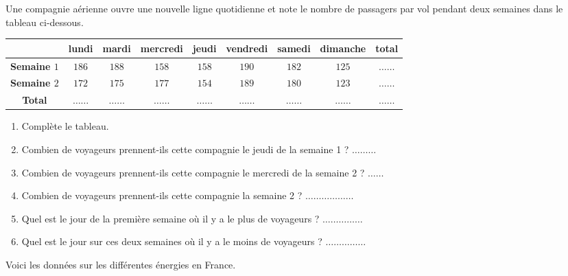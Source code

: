 \begin{pageAuto} 

 
\ExoAuto
 
Une compagnie aérienne ouvre une nouvelle ligne quotidienne et note le nombre de passagers par vol pendant deux semaines dans le tableau ci-dessous.

\begin{center}
\begin{tabular}{|c|c|c|c|c|c|c|c|c|}\hline 
 &  lundi	& mardi & mercredi& jeudi& vendredi& samedi& dimanche & total \\\hline
\textbf{Semaine $1$}  &  $186$	& $188$	 & $158$	& $158$	& $190$	& $182$	& $125$	 & $\ldots\ldots$	\\\hline
\textbf{Semaine $2$}  &  $172$  & $175$	 & $177$	& $154$	& $189$	& $180$	& $123$	 & $\ldots\ldots$\\\hline 
\textbf{Total}  &  $\ldots\ldots$  & $\ldots\ldots$	 & $\ldots\ldots$	& $\ldots\ldots$	& $\ldots\ldots$	& $\ldots\ldots$	& $\ldots\ldots$	 & $\ldots\ldots$\\\hline 
\end{tabular}
\end{center}

\begin{enumerate}
\item Complète le tableau.
\item Combien de voyageurs prennent-ils cette compagnie le jeudi de la semaine 1 ? $\ldots\ldots\ldots$
\item Combien de voyageurs prennent-ils cette compagnie le mercredi de la semaine 2 ? $\ldots\ldots$
\item Combien de voyageurs prennent-ils cette compagnie la semaine 2 ? $\ldots\ldots\ldots\ldots\ldots\ldots$
\item Quel est le jour de la première semaine où il y a le plus de voyageurs  ? $\ldots\ldots\ldots\ldots\ldots$
\item Quel est le jour sur ces deux semaines où il y a le moins de voyageurs  ? $\ldots\ldots\ldots\ldots\ldots$
\end{enumerate}

\ExoAuto

 \begin{minipage}{0.48\linewidth}
 Voici les données sur les différentes énergies en France. 
 
 \vspace{0.2cm}
 

\end{minipage}
\end{pageAuto}
